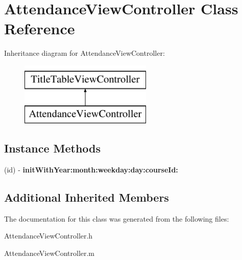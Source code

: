 \hypertarget{interface_attendance_view_controller}{\section{Attendance\+View\+Controller Class Reference}
\label{interface_attendance_view_controller}
}
Inheritance diagram for Attendance\+View\+Controller\+:\begin{figure}[H]
\begin{center}
\leavevmode
\includegraphics[height=3.000000cm]{interface_attendance_view_controller}
\end{center}
\end{figure}
\subsection*{Instance Methods}
\begin{DoxyCompactItemize}
\item 
\hypertarget{interface_attendance_view_controller_af8b1b06a44d046d768a3091ce56b93dd}{(id) -\/ {\bfseries init\+With\+Year\+:month\+:weekday\+:day\+:course\+Id\+:}}\label{interface_attendance_view_controller_af8b1b06a44d046d768a3091ce56b93dd}

\end{DoxyCompactItemize}
\subsection*{Additional Inherited Members}


The documentation for this class was generated from the following files\+:\begin{DoxyCompactItemize}
\item 
Attendance\+View\+Controller.\+h\item 
Attendance\+View\+Controller.\+m\end{DoxyCompactItemize}
